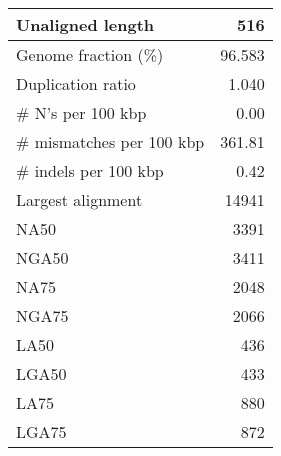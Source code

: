 \documentclass[12pt,a4paper]{article}
\begin{document}
\begin{table}[ht]
\begin{center}
\begin{tabular}{|l*{1}{|r}|}
Unaligned length & 516 \\ \hline
Genome fraction (\%) & 96.583 \\ \hline
Duplication ratio & 1.040 \\ \hline
\# N's per 100 kbp & 0.00 \\ \hline
\# mismatches per 100 kbp & 361.81 \\ \hline
\# indels per 100 kbp & 0.42 \\ \hline
Largest alignment & 14941 \\ \hline
NA50 & 3391 \\ \hline
NGA50 & 3411 \\ \hline
NA75 & 2048 \\ \hline
NGA75 & 2066 \\ \hline
LA50 & 436 \\ \hline
LGA50 & 433 \\ \hline
LA75 & 880 \\ \hline
LGA75 & 872 \\ \hline
\end{tabular}
\end{center}
\end{table}
\end{document}
